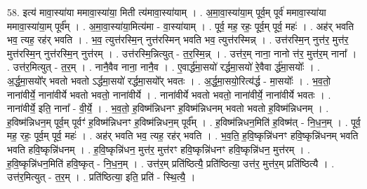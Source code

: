 \documentclass[17pt]{extarticle}
\begin{document}
58. इत्य॑ मावा॒स्या॑या ममावा॒स्या॑या॒ मिती त्य॑मावा॒स्या॑याम् । . अ॒मा॒वा॒स्या॑या॒म् पूर्व॒म् पूर्व॑ ममावा॒स्या॑या ममावा॒स्या॑या॒म् पूर्व᳚म् । . अ॒मा॒वा॒स्या॑या॒मित्य॑मा - वा॒स्या॑याम् । . पूर्व॒ मह॒ रहः॒ पूर्व॒म् पूर्व॒ महः॑ । . अह॑र् भवति भव॒ त्यह॒ रह॑र् भवति । . भ॒व॒ त्युत्त॑रस्मि॒न् नुत्त॑रस्मिन् भवति भव॒ त्युत्त॑रस्मिन्न् । . उत्त॑रस्मि॒न् नुत्त॑र॒ मुत्त॑र॒ मुत्त॑रस्मि॒न् नुत्त॑रस्मि॒न् नुत्त॑रम् । . उत्त॑रस्मि॒न्नित्युत् - त॒र॒स्मि॒न्न् । . उत्त॑र॒म् नाना॒ नानो त्त॑र॒ मुत्त॑र॒म् नाना᳚ । . उत्त॑र॒मित्युत् - त॒र॒म् । . नानै॒वैव नाना॒ नानै॒व । . ए॒वार्द्ध॑मा॒सयो॑ रर्द्धमा॒सयो॑ रे॒वैवा र्द्ध॑मा॒सयोः᳚ । . अ॒र्द्ध॒मा॒सयो᳚र् भवतो भवतो ऽर्द्धमा॒सयो॑ रर्द्धमा॒सयो᳚र् भवतः । . अ॒र्द्ध॒मा॒सयो॒रित्य॑र्द्ध - मा॒सयोः᳚ । . भ॒व॒तो॒ नाना॑वीर्ये॒ नाना॑वीर्ये भवतो भवतो॒ नाना॑वीर्ये । . नाना॑वीर्ये भवतो भवतो॒ नाना॑वीर्ये॒ नाना॑वीर्ये भवतः । . नाना॑वीर्ये॒ इति॒ नाना᳚ - वी॒र्ये॒ । . भ॒व॒तो॒ ह॒विष्म॑न्निधनꣳ ह॒विष्म॑न्निधनम् भवतो भवतो ह॒विष्म॑न्निधनम् । . ह॒विष्म॑न्निधन॒म् पूर्व॒म् पूर्वꣳ॑ ह॒विष्म॑न्निधनꣳ ह॒विष्म॑न्निधन॒म् पूर्व᳚म् । . ह॒विष्म॑न्निधन॒मिति॑ ह॒विष्म॑त् - नि॒ध॒न॒म् । . पूर्व॒ मह॒ रहः॒ पूर्व॒म् पूर्व॒ महः॑ । . अह॑र् भवति भव॒ त्यह॒ रह॑र् भवति । . भ॒व॒ति॒ ह॒वि॒ष्कृन्नि॑धनꣳ हवि॒ष्कृन्नि॑धनम् भवति भवति हवि॒ष्कृन्नि॑धनम् । . ह॒वि॒ष्कृन्नि॑धन॒ मुत्त॑र॒ मुत्त॑रꣳ हवि॒ष्कृन्नि॑धनꣳ हवि॒ष्कृन्नि॑धन॒ मुत्त॑रम् । . ह॒वि॒ष्कृन्नि॑धन॒मिति॑ हवि॒ष्कृत् - नि॒ध॒न॒म् । . उत्त॑र॒म् प्रति॑ष्ठित्यै॒ प्रति॑ष्ठित्या॒ उत्त॑र॒ मुत्त॑र॒म् प्रति॑ष्ठित्यै । . उत्त॑र॒मित्युत् - त॒र॒म् । . प्रति॑ष्ठित्या॒ इति॒ प्रति॑ - स्थि॒त्यै॒ । \newline
\end{document}
